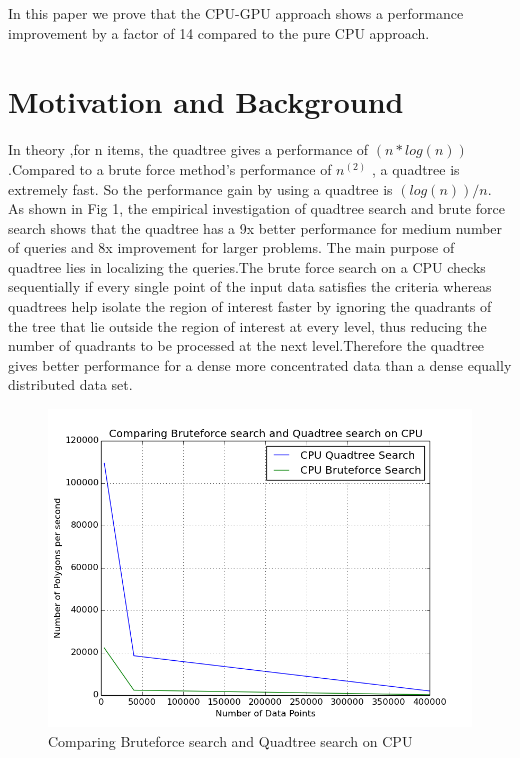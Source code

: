 \documentclass{article}
\begin{document}
In this paper we prove that the CPU-GPU approach  shows a performance improvement by a factor of 14 compared to the pure CPU approach.





\section{Motivation and Background}

In theory ,for n items, the quadtree gives a  performance of ${(n*log(n))}$ .Compared to a brute force method's performance of $n^{(2)}$ , a quadtree is extremely fast. So the performance gain by using a quadtree is ${(log(n))/n}$.  
As shown in Fig 1, the empirical investigation of quadtree search and brute force search shows that the quadtree has a 9x better performance for medium number of queries and 8x improvement for larger problems.
The main purpose of quadtree lies in localizing the queries.The brute force search on a CPU checks sequentially if every single point of the input data satisfies the criteria whereas quadtrees help isolate the region of interest faster by ignoring the quadrants of the tree that lie outside the region of interest at every level, thus reducing the number of quadrants to be processed at the next level.Therefore the quadtree gives better performance for a dense more concentrated data than a dense equally distributed data set.


\begin{figure}[H]
\centering
    \includegraphics[scale=0.55]{BruteVsQuadCPU_logscale_new_2}
    \caption{Comparing Bruteforce search and Quadtree search on CPU}
  \end{figure}
\end{document}
